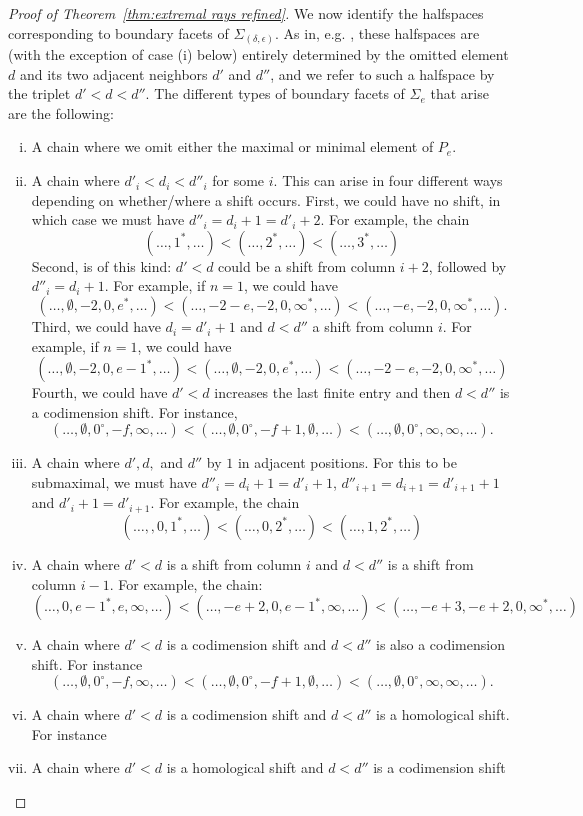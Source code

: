 \documentclass[12pt]{amsart}
\theoremstyle{definition}
\theoremstyle{remark}
\begin{document}
\begin{proof}[Proof of Theorem~\ref{thm:extremal rays refined}]
We now identify the halfspaces corresponding to boundary facets of $\Sigma_{(\delta,\epsilon)}$.  
As in, e.g. \cite[Proposition~2.12]{boij-sod1}, these halfspaces are (with the exception of case (i) below) entirely determined by the omitted element $d$ and its two adjacent neighbors $d'$ and $d''$, and we refer to such a halfspace by the triplet $d'<d<d''$.  The different types of boundary facets of $\Sigma_e$ that arise are the following:
\begin{enumerate}[(i)]
	\item A chain where we omit either the maximal or minimal element of $P_e$.
	\item A chain where $d'_i<d_i<d''_i$ for some $i$.  This can arise in four different ways depending on whether/where a shift occurs.  First, we could have no shift, in which case we must have $d''_i=d_i+1=d'_i+2$.  For example, the chain
	\[
(\dots,1^*,\dots) <(\dots, 2^*,\dots) <(\dots,3^*,\dots)
	\]
Second, is of this kind: $d'<d$ could be a shift from column $i+2$, followed by $d''_i=d_i+1$.  For example, if $n=1$, we could have
	\[
	(\dots, \emptyset, -2, 0, e^*, \dots)<(\dots, -2-e,-2, 0, \infty^*, \dots)<(\dots, -e,-2, 0, \infty^*, \dots).
	\]
Third, we could have $d_i=d'_i+1$ and $d<d''$ a shift from column $i$. For example, if $n=1$, we could have
	\[
	(\dots, \emptyset, -2, 0, e-1^*, \dots)<(\dots, \emptyset, -2, 0, e^*, \dots)<(\dots, -2-e,-2, 0, \infty^*, \dots)	\]
Fourth, we could have $d'<d$ increases the last finite entry and then $d<d''$ is a codimension shift.  For instance,
\[
(\dots,\emptyset,0^\circ,-f,\infty,\dots)<(\dots,\emptyset,0^\circ,-f+1,\emptyset,\dots)<(\dots,\emptyset,0^\circ,\infty,\infty,\dots).
\]

	\item A chain where $d', d,$ and $d''$ by $1$ in adjacent positions.  For this to be submaximal, we must have $d''_i=d_i+1=d'_i+1$, $d''_{i+1}=d_{i+1}=d'_{i+1}+1$ and $d'_i+1=d'_{i+1}$.  For example, the chain
			\[
(\dots,, 0,1^*,\dots) <(\dots, 0,2^*,\dots) <(\dots, 1,2^*,\dots) 
			\]
	\item A chain where $d'<d$ is a shift from column $i$ and $d<d''$ is a shift from column $i-1$.  For example, the chain:
		\[
		(\dots, 0,e-1^*,e,\infty,\dots)<(\dots, -e+2,0,e-1^*,\infty,\dots)<(\dots, -e+3,-e+2,0,\infty^*,\dots)
		\]
	\item A chain where $d'<d$ is a codimension shift and $d<d''$ is also a codimension shift.  
For instance
\[
(\dots,\emptyset,0^\circ,-f,\infty,\dots)<(\dots,\emptyset,0^\circ,-f+1,\emptyset,\dots)<(\dots,\emptyset,0^\circ,\infty,\infty,\dots).
\]
	\item   A chain where $d'<d$ is a codimension shift and $d<d''$ is a homological shift.  For  instance
	\item   A chain where $d'<d$ is a homological shift and $d<d''$ is a codimension shift
\end{enumerate} 


\end{proof}
\end{document}
